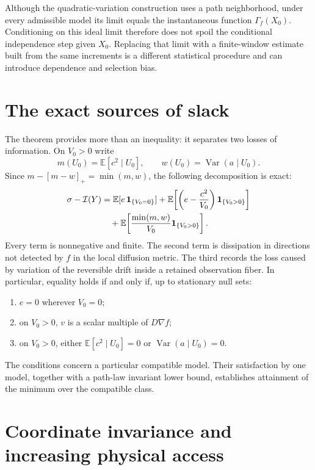 Although the quadratic-variation construction uses a path neighborhood,
under every admissible model its limit equals the instantaneous function
$\Gamma_f(X_0)$. Conditioning on this ideal limit therefore does not spoil
the conditional independence step given $X_0$. Replacing that limit with a
finite-window estimate built from the same increments is a different
statistical procedure and can introduce dependence and selection bias.

\section{The exact sources of slack}

The theorem provides more than an inequality: it separates two losses of
information. On $V_0>0$ write
\[
 m(U_0)=\mathbb E[c^2\mid U_0],\qquad
 w(U_0)=\operatorname{Var}(a\mid U_0).
\]
Since $m-[m-w]_+=\min(m,w)$, the following decomposition is exact:
\begin{align}
 \sigma-\mathcal I(Y)
 &=\mathbb E[e\,\mathbf 1_{\{V_0=0\}}]
   +\mathbb E\!\left[
      \left(e-\frac{c^2}{V_0}\right)
           \mathbf 1_{\{V_0>0\}}\right] \notag\\
 &\quad+\mathbb E\!\left[
      \frac{\min(m,w)}{V_0}\mathbf 1_{\{V_0>0\}}\right].
 \label{eq:og-slack}
\end{align}
Every term is nonnegative and finite. The second term is dissipation in
directions not detected by $f$ in the local diffusion metric. The third
records the loss caused by variation of the reversible drift inside a
retained observation fiber. In particular, equality holds if and only if,
up to stationary null sets:
\begin{enumerate}
 \item $e=0$ wherever $V_0=0$;
 \item on $V_0>0$, $v$ is a scalar multiple of $D\nabla f$;
 \item on $V_0>0$, either $\mathbb E[c^2\mid U_0]=0$ or
       $\operatorname{Var}(a\mid U_0)=0$.
\end{enumerate}
The conditions concern a particular compatible model. Their satisfaction
by one model, together with a path-law invariant lower bound, establishes
attainment of the minimum over the compatible class.

\section{Coordinate invariance and increasing physical access}

